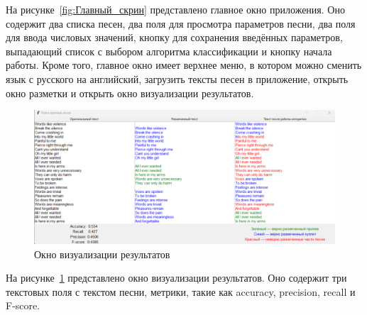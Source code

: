 На рисунке~\ref{fig:Главный_скрин} представлено главное окно приложения. Оно содержит два списка песен, два поля для просмотра параметров песни, два поля для ввода числовых значений, кнопку для сохранения введённых параметров, выпадающий список с выбором алгоритма классификации и кнопку начала работы. Кроме того, главное окно имеет верхнее меню, в котором можно сменить язык с русского на английский, загрузить тексты песен в приложение, открыть окно разметки и открыть окно визуализации результатов.

\begin{figure}
    \centering
    \includegraphics[width=1\linewidth]{pictures/Результаты_скрин.png}
    \caption{Окно визуализации результатов}
    \label{fig:Результаты_скрин}
\end{figure}

На рисунке~\ref{fig:Результаты_скрин} представлено окно визуализации результатов. Оно содержит три текстовых поля с текстом песни, метрики, такие как accuracy, precision, recall и F-score.